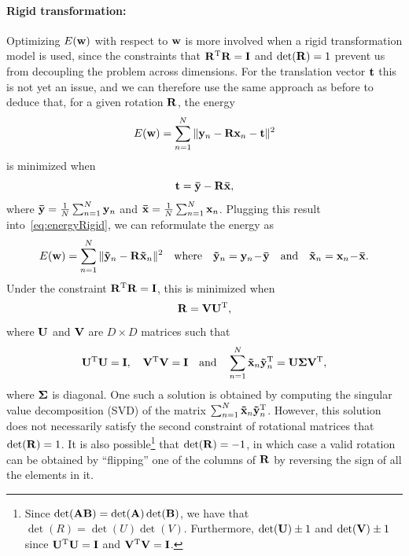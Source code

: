 \documentclass[10pt,twoside]{book}
\begin{document}
\paragraph{Rigid transformation:}
%
Optimizing $E(\mathbf{w})$ with respect to $\mathbf{w}$ is more involved when a rigid transformation model is used, since the constraints 
that $\mathbf{R}^\mathrm{T}\mathbf{R} = \mathbf{I}$ and 
$\det(\mathbf{R})=1$ prevent us from decoupling the problem across dimensions.
For the translation vector $\mathbf{t}$ this is not yet an issue, and 
we can therefore use the same approach as before to deduce that, for a given rotation $\mathbf{R}$, the energy
\begin{equation}
E(\mathbf{w}) = \sum_{n=1}^N \| \mathbf{y}_n - \mathbf{R} \mathbf{x}_n - \mathbf{t} \|^2
\label{eq:energyRigid}
\end{equation}
is minimized when 
\begin{equation}
\mathbf{t} = \mathbf{\bar{y}} - \mathbf{R} \mathbf{\bar{x}},
\label{eq:solutionForTranslationInRigid}
\end{equation}
where
$
\mathbf{\bar{y}} = \frac{1}{N} \sum_{n=1}^N \mathbf{y}_n
$
and
$
\mathbf{\bar{x}} = \frac{1}{N} \sum_{n=1}^N \mathbf{x}_n
$.
% 
Plugging this result into~\eqref{eq:energyRigid}, we can reformulate the energy as
$$
E(\mathbf{w}) = \sum_{n=1}^N \| \mathbf{\tilde{y}}_n - \mathbf{R} \mathbf{\tilde{x}}_n \|^2
\quad 
\text{where}
\quad
\mathbf{\tilde{y}}_n = \mathbf{y}_n \! - \! \mathbf{\bar{y}}
\quad 
\text{and}
\quad
\mathbf{\tilde{x}}_n = \mathbf{x}_n \! - \! \mathbf{\bar{x}}
.
$$
Under the constraint $\mathbf{R}^\mathrm{T}\mathbf{R} = \mathbf{I}$, this is minimized when~\cite{schonemann1966generalized}
$$
\mathbf{R} = \mathbf{V} \mathbf{U}^\mathrm{T}, 
$$
where $\mathbf{U}$ and $\mathbf{V}$ are $D \times D$ matrices such that
$$
\mathbf{U}^\mathrm{T} \mathbf{U} = \mathbf{I},
\quad
\mathbf{V}^\mathrm{T} \mathbf{V} = \mathbf{I}
\quad
\text{and}
\quad
\sum_{n=1}^N \mathbf{\tilde{x}}_n \mathbf{\tilde{y}}_n^\mathrm{T} 
=
\mathbf{U}
{\mbox{\boldmath {${\Sigma}$}}}
\mathbf{V}^\mathrm{T}
,
$$
where ${\mbox{\boldmath {${\Sigma}$}}}$ is diagonal.
%
One such a solution is obtained by computing the singular value decomposition (SVD) of the matrix 
$\sum_{n=1}^N \mathbf{\tilde{x}}_n \mathbf{\tilde{y}}_n^\mathrm{T}$.
However, this solution does not necessarily satisfy the second constraint of rotational matrices that 
$\det( \mathbf{R} ) = 1$. It is also possible\footnote{%
Since $\det(\mathbf{A} \mathbf{B}) = \det(\mathbf{A}) \det(\mathbf{B})$,
we have that $\det(R) = \det(U) \det(V)$.
Furthermore,
$\det(\mathbf{U}) \pm 1$ and $\det(\mathbf{V}) \pm 1$ since $\mathbf{U}^\mathrm{T} \mathbf{U} = \mathbf{I}$ and $\mathbf{V}^\mathrm{T} \mathbf{V} = \mathbf{I}$.
}
that $\det( \mathbf{R} ) = -1$, in which case a valid rotation can be obtained by ``flipping'' one of the columns of $\mathbf{R}$ by reversing the sign of all the elements in it.
\end{document}

